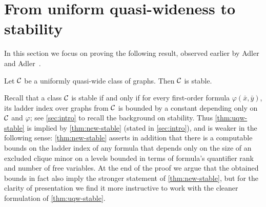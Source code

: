 
\section{From uniform quasi-wideness to stability}\label{sec:stable}

In this section we focus on proving the following result, observed earlier by Adler and Adler~\cite{adler2014interpreting}.

\begin{theorem}\label{thm:uqw-stable}
	Let $\cal C$ be a uniformly quasi-wide class of graphs.
	Then $\cal C$ is stable. %
\end{theorem}

Recall that a class $\cal C$ is stable if and only if for every first-order formula $\varphi(\bar x,\bar y)$, its ladder index over graphs from $\cal C$ is bounded by a constant depending only on $\cal C$ and $\varphi$;
see \cref{sec:intro} to recall the background on stability.
Thus \cref{thm:uqw-stable} is implied by \cref{thm:new-stable} (stated in \cref{sec:intro}), and is weaker in the following sense: \cref{thm:new-stable} asserts in addition that there is a computable bounds on the ladder index
of any formula that depends only on the size of an excluded clique minor on a levels bounded in terms of formula's quantifier rank and number of free variables. At the end of the proof we argue that
the obtained bounds in fact also imply the stronger statement of \cref{thm:new-stable}, but for the clarity of presentation we find it more instructive to work with the cleaner formulation of \cref{thm:uqw-stable}.









